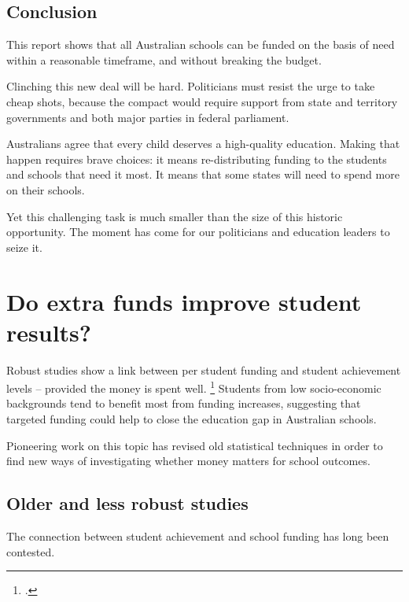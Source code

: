 \documentclass{grattan}
\begin{document}
\section{Conclusion}\label{sec:conclusion}

This report shows that all Australian schools can be funded on the basis of need within a reasonable timeframe, and without breaking the budget.

Clinching this new deal will be hard.
Politicians must resist the urge to take cheap shots, because the compact would require support from state and territory governments and both major parties in federal parliament.

Australians agree that every child deserves a high-quality education.
Making that happen requires brave choices: it means re-distributing funding to the students and schools that need it most.
It means that some states will need to spend more on their schools.

Yet this challenging task is much smaller than the size of this historic opportunity.
The moment has come for our politicians and education leaders to seize it.


\appendix


\chapter{Do extra funds improve student results?}\label{chap:appendix-2-do-extra-funds-improve-student-results}

Robust studies show a link between per student funding and student achievement levels -- provided the money is spent well.%
\footcites{Card2002Schoolfinancereform}{Chetty2011HowDoesYour}{Gibbons2012Doesadditionalspending}{Guryan2001DoesMoneyMatter}{Jackson2016EffectsSchoolSpending}{Lafortune2016SchoolFinanceReform}
 Students from low socio-economic backgrounds tend to benefit most from funding increases, suggesting that targeted funding could help to close the education gap in Australian schools.

Pioneering work on this topic has revised old statistical techniques in order to find new ways of investigating whether money matters for school outcomes.

\section{Older and less robust studies}\label{sec:criticism-of-older-studies}
The connection between student achievement and school funding has long been contested.
\end{document}
